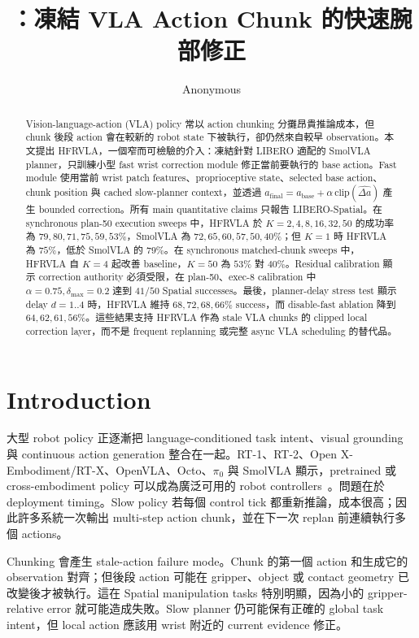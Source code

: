 \documentclass[10pt]{article}
\title{\method{}：凍結 VLA Action Chunk 的快速腕部修正}
\author{Anonymous}
\date{}
\newcommand{\method}{HFRVLA}
\newcommand{\smolvla}{SmolVLA}
\newcommand{\abase}{a_{\mathrm{base}}}
\newcommand{\afinal}{a_{\mathrm{final}}}
\newcommand{\deltah}{\hat{\Delta a}}
\newcommand{\dmax}{\delta_{\max}}
\begin{document}
\maketitle

\begin{abstract}
Vision-language-action (VLA) policy 常以 action chunking 分攤昂貴推論成本，但 chunk 後段 action 會在較新的 robot state 下被執行，卻仍然來自較早 observation。本文提出 \method{}，一個窄而可檢驗的介入：凍結針對 LIBERO 適配的 \smolvla{} planner，只訓練小型 fast wrist correction module 修正當前要執行的 base action。Fast module 使用當前 wrist patch features、proprioceptive state、selected base action、chunk position 與 cached slow-planner context，並透過 $\afinal=\abase+\alpha\,\mathrm{clip}(\deltah)$ 產生 bounded correction。所有 main quantitative claims 只報告 LIBERO-Spatial。在 synchronous plan-50 execution sweeps 中，\method{} 於 $K=2,4,8,16,32,50$ 的成功率為 $79,80,71,75,59,53\%$，\smolvla{} 為 $72,65,60,57,50,40\%$；但 $K=1$ 時 \method{} 為 $75\%$，低於 \smolvla{} 的 $79\%$。在 synchronous matched-chunk sweeps 中，\method{} 自 $K=4$ 起改善 baseline，$K=50$ 為 $53\%$ 對 $40\%$。Residual calibration 顯示 correction authority 必須受限，在 plan-50、exec-8 calibration 中 $\alpha=0.75,\dmax=0.2$ 達到 $41/50$ Spatial successes。最後，planner-delay stress test 顯示 delay $d=1..4$ 時，\method{} 維持 $68,72,68,66\%$ success，而 disable-fast ablation 降到 $64,62,61,56\%$。這些結果支持 \method{} 作為 stale VLA chunks 的 clipped local correction layer，而不是 frequent replanning 或完整 async VLA scheduling 的替代品。
\end{abstract}

\section{Introduction}

大型 robot policy 正逐漸把 language-conditioned task intent、visual grounding 與 continuous action generation 整合在一起。RT-1、RT-2、Open X-Embodiment/RT-X、OpenVLA、Octo、$\pi_0$ 與 \smolvla{} 顯示，pretrained 或 cross-embodiment policy 可以成為廣泛可用的 robot controllers~\citep{brohan2022rt1,brohan2023rt2,openx2024,kim2024openvla,ghosh2024octo,black2024pi0,shukor2025smolvla}。問題在於 deployment timing。Slow policy 若每個 control tick 都重新推論，成本很高；因此許多系統一次輸出 multi-step action chunk，並在下一次 replan 前連續執行多個 actions。

Chunking 會產生 stale-action failure mode。Chunk 的第一個 action 和生成它的 observation 對齊；但後段 action 可能在 gripper、object 或 contact geometry 已改變後才被執行。這在 Spatial manipulation tasks 特別明顯，因為小的 gripper-relative error 就可能造成失敗。Slow planner 仍可能保有正確的 global task intent，但 local action 應該用 wrist 附近的 current evidence 修正。
\end{document}
